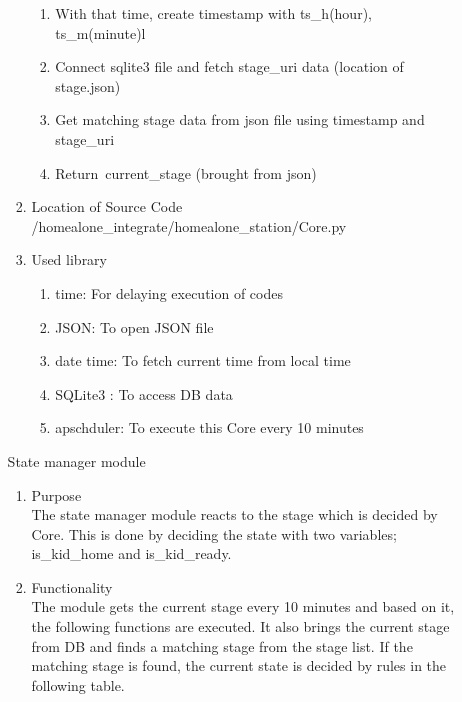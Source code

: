 \documentclass[conference]{IEEEtran}
\begin{document}
\begin{enumerate}[label=\arabic*.]
\begin{enumerate}[label=\arabic*.]
\begin{enumerate}[label=\alph*.]
\begin{enumerate}[label=\roman*.]
            \item {\large{With that time, create timestamp with ts\_h(hour), ts\_m(minute)l}}
            \item {\large{Connect sqlite3 file and fetch stage\_uri data (location of stage.json)}}
            \item {\large{Get matching stage data from json file using timestamp and stage\_uri}}
            \item {\large{Return\ current\_stage (brought from json)}}\\
        \end{enumerate}
        \item{\large{Location of Source Code}}\\
        \large{/homealone\_integrate/homealone\_station/Core.py}\\   
        \item {\large{Used library}}
        \begin{enumerate}[label=\roman*.]
            \item {\large{time: For delaying execution of codes}}
            \item {\large{JSON: To open JSON file}}
            \item {\large{date time: To fetch current time from local time}}
            \item {\large{SQLite3 : To access DB data}}
            \item {\large{apschduler: To execute this Core every 10 minutes}}\\
        \end{enumerate}
    \end{enumerate}
    \begin{center}\large{State manager module}\end{center} 
    \begin{enumerate}[label=\alph*.]
        \item {\large{Purpose}}\\
        The state manager module reacts to the stage which is decided by Core. This is done by deciding the state with two variables; is\_kid\_home and  is\_kid\_ready.\\
        \item {\large{Functionality}}\\
        The module gets the current stage every 10 minutes and based on it, the following functions are executed. It also brings the current stage from DB and finds a matching stage from the stage list. If the matching stage is found, the current state is decided by rules in the following table.\\

\end{enumerate}
\end{enumerate}
\end{enumerate}
\end{document}
